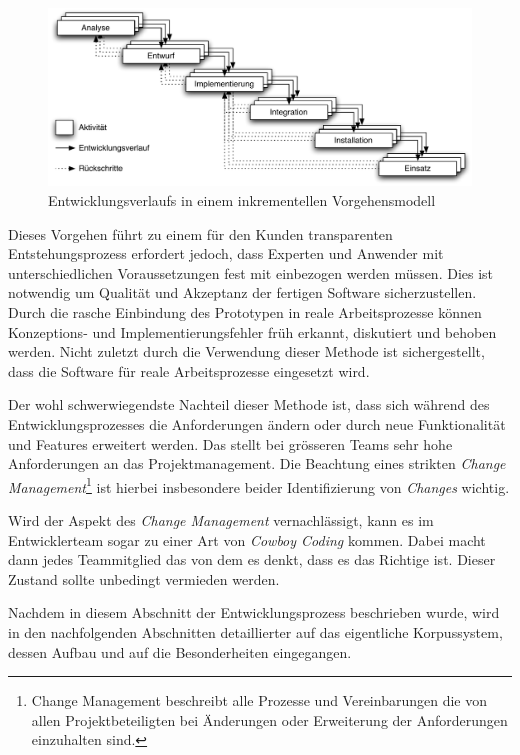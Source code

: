 \begin{figure}[H]
	\centering
	\includegraphics*[width=1.0\textwidth]{figures/DA/Vorgehensmodell.pdf}
	\caption{Entwicklungsverlaufs in einem inkrementellen Vorgehensmodell \citep[][Seite 12]{bunse2002}}\label{fig:Vorgehensmodell}
\end{figure}


Dieses Vorgehen führt zu einem für den Kunden transparenten Entstehungsprozess erfordert jedoch, dass Experten und Anwender mit unterschiedlichen Voraussetzungen fest mit einbezogen werden müssen. Dies ist notwendig um Qualität und Akzeptanz der fertigen Software sicherzustellen. Durch die rasche Einbindung des Prototypen in reale Arbeitsprozesse können Konzeptions- und Implementierungsfehler früh erkannt, diskutiert und behoben  werden. Nicht zuletzt durch die Verwendung dieser Methode ist sichergestellt, dass die Software für reale Arbeitsprozesse eingesetzt wird.

Der wohl schwerwiegendste Nachteil dieser Methode ist, dass sich während des Entwicklungsprozesses die Anforderungen ändern oder durch neue Funktionalität und Features erweitert werden. Das stellt bei grösseren Teams sehr hohe Anforderungen an das Projektmanagement. Die Beachtung eines strikten \emph{Change Management}\footnote{Change Management beschreibt alle Prozesse und Vereinbarungen die von allen Projektbeteiligten bei Änderungen oder Erweiterung der Anforderungen einzuhalten sind.} ist hierbei insbesondere beider Identifizierung von \emph{Changes} wichtig.

Wird der Aspekt des \emph{Change Management} vernachlässigt, kann es im Entwicklerteam sogar zu einer Art von \emph{Cowboy Coding} kommen. Dabei macht dann jedes Teammitglied das von dem es denkt, dass es das Richtige ist. Dieser Zustand sollte unbedingt vermieden werden.

Nachdem in diesem Abschnitt der Entwicklungsprozess beschrieben wurde, wird in den nachfolgenden Abschnitten detaillierter auf das eigentliche Korpussystem, dessen Aufbau und auf die Besonderheiten eingegangen.






